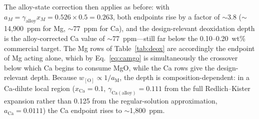 \documentclass[pdflatex,sn-basic,Numbered]{sn-jnl}
\begin{document}
The alloy-state correction then applies as before: with $a_M = \gamma_{\mathrm{alloy}} x_M = 0.526 \times 0.5 = 0.263$, both endpoints rise by a factor of $\sim$3.8 ($\sim$14{,}900~ppm for Mg, $\sim$77~ppm for Ca), and the design-relevant deoxidation depth is the alloy-corrected Ca value of $\sim$77~ppm---still far below the 0.10--0.20~wt\% commercial target. The Mg rows of Table~\ref{tab:deox} are accordingly the endpoint of Mg acting alone, which by Eq.~\ref{eq:camgo} is simultaneously the crossover below which Ca begins to consume MgO, while the Ca rows give the design-relevant depth. Because $w_{[\mathrm{O}]} \propto 1/a_{\mathrm{M}}$, the depth is composition-dependent: in a Ca-dilute local region ($x_{\mathrm{Ca}} = 0.1$, $\gamma_{\mathrm{Ca(alloy)}} = 0.111$ from the full Redlich--Kister expansion rather than 0.125 from the regular-solution approximation, $a_{\mathrm{Ca}} = 0.0111$) the Ca endpoint rises to $\sim$1{,}800~ppm.
\end{document}
